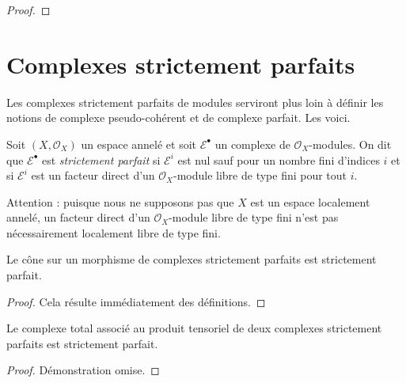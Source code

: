 {\begin{proof}
\end{proof}



\section{Complexes strictement parfaits}

\label{section-strictly-perfect}

\noindent
Les complexes strictement parfaits de modules serviront plus loin à définir les notions de complexe pseudo-cohérent et de complexe parfait. Les voici.

\begin{definition}

\label{definition-strictly-perfect}
Soit $(X, \mathcal{O}_X)$ un espace annelé et soit $\mathcal{E}^\bullet$ un complexe de $\mathcal{O}_X$-modules. On dit que $\mathcal{E}^\bullet$ est {\it strictement parfait} si $\mathcal{E}^i$ est nul sauf pour un nombre fini d'indices $i$ et si $\mathcal{E}^i$ est un facteur direct d'un $\mathcal{O}_X$-module libre de type fini pour tout $i$.
\end{definition}

\noindent
Attention : puisque nous ne supposons pas que $X$ est un espace localement annelé, un facteur direct d'un $\mathcal{O}_X$-module libre de type fini n'est pas nécessairement localement libre de type fini.

\begin{lemma}

\label{lemma-cone}

Le cône sur un morphisme de complexes strictement parfaits est strictement parfait.

\end{lemma}

\begin{proof}
Cela résulte immédiatement des définitions.
\end{proof}

\begin{lemma}

\label{lemma-tensor}

Le complexe total associé au produit tensoriel de deux complexes strictement parfaits est strictement parfait.

\end{lemma}

\begin{proof}
Démonstration omise.
\end{proof}

}
